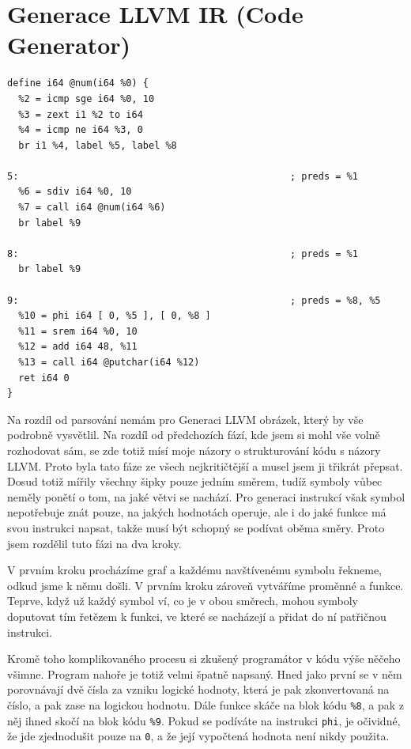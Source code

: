 \documentclass[12pt, a4paper, titlepage, abstract=on]{scrreprt}
\begin{document}
\section{Generace LLVM IR (Code Generator)}
\begin{listing}[H]
\begin{verbatim}
define i64 @num(i64 %0) {
  %2 = icmp sge i64 %0, 10
  %3 = zext i1 %2 to i64
  %4 = icmp ne i64 %3, 0
  br i1 %4, label %5, label %8

5:                                                ; preds = %1
  %6 = sdiv i64 %0, 10
  %7 = call i64 @num(i64 %6)
  br label %9

8:                                                ; preds = %1
  br label %9

9:                                                ; preds = %8, %5
  %10 = phi i64 [ 0, %5 ], [ 0, %8 ]
  %11 = srem i64 %0, 10
  %12 = add i64 48, %11
  %13 = call i64 @putchar(i64 %12)
  ret i64 0
}
\end{verbatim}
\caption{Funkce num(n) zkompilovaná do LLVM IR}
\end{listing}
Na rozdíl od parsování nemám pro Generaci LLVM obrázek, který by vše podrobně vysvětlil. Na rozdíl od předchozích fází, kde jsem si mohl vše
volně rozhodovat sám, se zde totiž mísí moje názory o strukturování kódu s názory LLVM. Proto byla tato fáze ze všech nejkritičtější a musel
jsem ji třikrát přepsat. Dosud totiž mířily všechny šipky pouze jedním směrem, tudíž symboly vůbec neměly ponětí o tom, na jaké větvi se nachází.
Pro generaci instrukcí však symbol nepotřebuje znát pouze, na jakých hodnotách operuje, ale i do jaké funkce má svou instrukci napsat, takže musí
být schopný se podívat oběma směry. Proto jsem rozdělil tuto fázi na dva kroky.

V prvním kroku procházíme graf a každému navštívenému symbolu řekneme, odkud jsme k němu došli. V prvním kroku zároveň vytváříme proměnné
a funkce. Teprve, když už každý symbol ví, co je v obou směrech, mohou symboly doputovat tím řetězem k funkci, ve které se nacházejí a přidat
do ní patřičnou instrukci.

Kromě toho komplikovaného procesu si zkušený programátor v kódu výše něčeho všimne. Program nahoře je totiž velmi špatně napsaný. Hned jako první
se v něm porovnávají dvě čísla za vzniku logické hodnoty, která je pak zkonvertovaná na číslo, a pak zase na logickou hodnotu. Dále funkce skáče
na blok kódu \texttt{\%8}, a pak z něj ihned skočí na blok kódu \texttt{\%9}. Pokud se podíváte na instrukci \texttt{phi}, je očividné, že jde
zjednodušit pouze na \texttt{0}, a že její vypočtená hodnota není nikdy použita.
\end{document}
